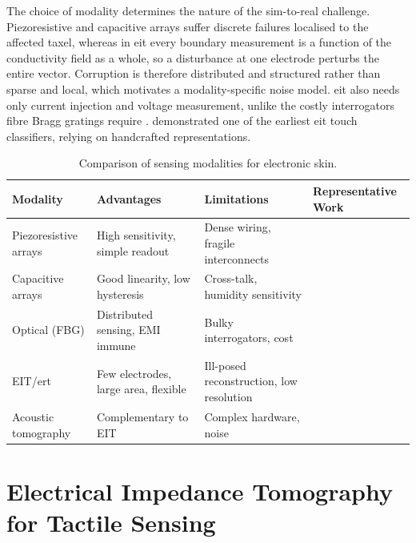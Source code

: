 The choice of modality determines the nature of the sim-to-real challenge. Piezoresistive and capacitive arrays suffer discrete failures localised to the affected taxel, whereas in \gls{eit} every boundary measurement is a function of the conductivity field as a whole, so a disturbance at one electrode perturbs the entire vector. Corruption is therefore distributed and structured rather than sparse and local, which motivates a modality-specific noise model. \gls{eit} also needs only current injection and voltage measurement, unlike the costly interrogators fibre Bragg gratings require \parencite{silvera-tawil2015, massari2022}. \textcite{silvera-tawil2012eit} demonstrated one of the earliest \gls{eit} touch classifiers, relying on handcrafted representations.


\begin{table}[htbp]
\centering
\caption[Comparison of sensing modalities for electronic skin]{Comparison of sensing modalities for electronic skin.}
\label{tab:sensing-comparison}
\small
\begin{tabularx}{\textwidth}{@{}XXXX@{}}
\toprule
\textbf{Modality} & \textbf{Advantages} & \textbf{Limitations} & \textbf{Representative Work} \\
\midrule
Piezoresistive arrays & High sensitivity, simple readout & Dense wiring, fragile interconnects & \textcite{yu2024} \\
\midrule
Capacitive arrays & Good linearity, low hysteresis & Cross-talk, humidity sensitivity & \textcite{hammock2013} \\
\midrule
Optical (FBG) & Distributed sensing, EMI immune & Bulky interrogators, cost & \textcite{massari2022} \\
\midrule
EIT/\gls{ert} & Few electrodes, large area, flexible & Ill-posed reconstruction, low resolution & \textcite{chen2023, wang2025} \\
\midrule
Acoustic tomography & Complementary to EIT & Complex hardware, noise & \textcite{park2022skin} \\
\bottomrule
\end{tabularx}
\end{table}

\section{Electrical Impedance Tomography for Tactile Sensing}
\label{sec:lit-eit}

